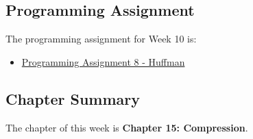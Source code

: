 \subsection{Programming Assignment}

The programming assignment for Week 10 is:

\begin{itemize}
    \item \href{https://github.com/QuantumCompiler/CU/tree/main/CSPB%202270%20-%20Data%20Structures/Assignments/Assignment%208%20-%20Huffman%20Table}{Programming Assignment 8 - Huffman}
\end{itemize}

\subsection{Chapter Summary}

The chapter of this week is \textbf{Chapter 15: Compression}.

